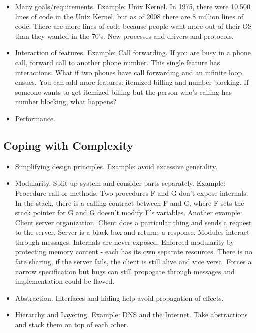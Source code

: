 \documentclass[psamsfonts]{amsart}
\begin{document}
\begin{itemize}
\item Many goals/requirements. Example: Unix Kernel. In 1975, there were 10,500 lines of code in the Unix Kernel, but as of 2008 there are 8 million lines of code. There are more lines of code because people want more out of their OS than they wanted in the 70's. New processes and drivers and protocols.
\item Interaction of features. Example: Call forwarding. If you are busy in a phone call, forward call to another phone number. This single feature has interactions. What if two phones have call forwarding and an infinite loop ensues. You can add more features: itemized billing and number blocking. If someone wants to get itemized billing but the person who's calling has number blocking, what happens?  
\item Performance.
\end{itemize}

\subsection{Coping with Complexity}

\begin{itemize}
\item Simplifying design principles. Example: avoid excessive generality.
\item Modularity. Split up system and consider parts separately. Example: Procedure call or methods. Two procedures F and G don't expose internals. In the stack, there is a calling contract between F and G, where F sets the stack pointer for G and G doesn't modify F's variables. Another example: Client server organization. Client does a particular thing and sends a request to the server. Server is a black-box and returns a response. Modules interact through messages. Internals are never exposed. Enforced modularity by protecting memory content - each has its own separate resources. There is no fate sharing, if the server fails, the client is still alive and vice versa. Forces a narrow specification but bugs can still propogate through messages and implementation could be flawed. 
\item Abstraction. Interfaces and hiding help avoid propagation of effects.
\item Hierarchy and Layering. Example: DNS and the Internet. Take abstractions and stack them on top of each other.
\end{itemize}
\end{document}
